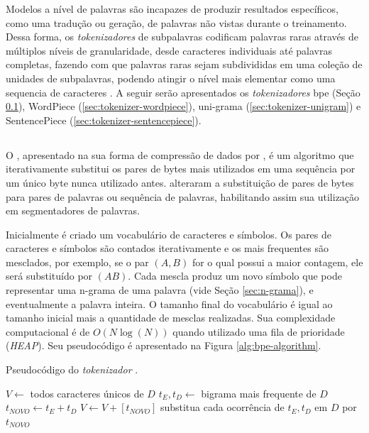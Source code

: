 Modelos a nível de palavras são incapazes de produzir resultados específicos, como uma tradução ou geração, de palavras não vistas durante o treinamento. Dessa forma, os \textit{tokenizadores} de subpalavras codificam palavras raras através de múltiplos níveis de granularidade, desde caracteres individuais até palavras completas, fazendo com que palavras raras sejam subdivididas em uma coleção de unidades de subpalavras, podendo atingir o nível mais elementar como uma sequencia de caracteres \cite{Bostrom2020BytePair}. A seguir serão apresentados os \textit{tokenizadores} \gls{bpe} (Seção \ref{sec:tokenizer-bpe}), WordPiece (\ref{sec:tokenizer-wordpiece}),  uni-grama (\ref{sec:tokenizer-unigram}) e SentencePiece (\ref{sec:tokenizer-sentencepiece}).

\subsection{}
\label{sec:tokenizer-bpe}

O , apresentado na sua forma de compressão de dados por \textcite{Gage1994ANewAlgorithm}, é um algoritmo que iterativamente substitui os pares de bytes mais utilizados em uma sequência por um único byte nunca utilizado antes. \textcite{Sennrich2016Neural} alteraram a substituição de pares de bytes para pares de palavras ou sequência de palavras, habilitando assim sua utilização em segmentadores de palavras.

Inicialmente é criado um vocabulário de caracteres e símbolos. Os pares de caracteres e símbolos são contados iterativamente e os mais frequentes são mesclados, por exemplo, se o par $(A, B)$ for o qual possui a maior contagem, ele será substituído por $(AB)$. Cada mescla produz um novo símbolo que pode representar uma n-grama de uma palavra (vide Seção \ref{sec:n-grama}), e eventualmente a palavra inteira. O tamanho final do vocabulário é igual ao tamanho inicial mais a quantidade de mesclas realizadas. Sua complexidade computacional é de $O(N \log(N))$ quando utilizado uma fila de prioridade (\textit{HEAP}). Seu pseudocódigo é apresentado na Figura \ref{alg:bpe-algorithm}.

\begin{algorithm}
    \caption{Pseudocódigo do \textit{tokenizador} .}
    $V \gets$ todos caracteres únicos de $D$\;
     {
        $t_E,t_D \gets$ bigrama mais frequente de $D$\;
        $t_{NOVO} \gets t_E + t_D$\;
        $V \gets V + [t_{NOVO}]$\;
        substitua cada ocorrência de $t_E,t_D$ em $D$ por $t_{NOVO}$\;
    }
    \label{alg:bpe-algorithm}
\end{algorithm}

